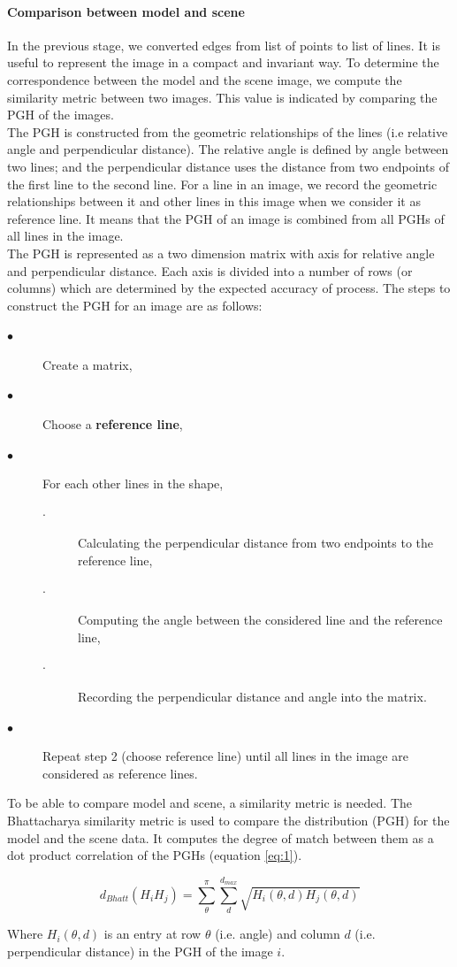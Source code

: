 \documentclass[twoside,twocolumn,10pt]{article}
\begin{document}
\paragraph{Comparison between model and scene}
In the previous stage, we converted edges from list of points to list of lines. It is useful to represent the image in a compact and invariant way. To determine the correspondence between the model and the scene image, we compute the similarity metric between two images. This value is indicated by comparing the PGH\cite{evans1993use} of the images.\\
The PGH is constructed from the geometric relationships of the lines (i.e relative angle and perpendicular distance). The relative angle is defined by angle between two lines; and the perpendicular distance uses the distance from two endpoints of the first line to the second line. For a line in an image, we record the geometric relationships between it and other lines in this image when we consider it as reference line. It means that the PGH of an image is combined from all PGHs of all lines in the image.\\
The PGH is represented as a two dimension matrix with axis for relative angle and perpendicular distance. Each axis is divided into a number of rows (or columns) which are determined by the expected accuracy of process. The steps to construct the PGH for an image are as follows:
{\small{
\begin{description}
\item[$\bullet$] Create a matrix,
\item[$\bullet$] Choose a \textbf{reference line},
\item[$\bullet$] For each other lines in the shape,
	\begin{description}
		\item[$\cdot$] Calculating the perpendicular distance from two endpoints to the reference line,
		\item[$\cdot$] Computing the angle between the considered line and the reference line,
		\item[$\cdot$] Recording the perpendicular distance and angle into the matrix.
	\end{description}
\item[$\bullet$] Repeat step 2 (choose reference line) until all lines in the image are considered as reference lines.
\end{description}
}}
To be able to compare model and scene, a similarity metric
is needed. The Bhattacharya similarity
metric \cite{palaniswamy2010automatic} is used to compare the distribution (PGH) for the model and the
scene data. It computes the degree of match between them as a dot product correlation of the PGHs (equation \ref{eq:1}).
\begin{center}
\begin{equation} \label{eq:1}
d_{Bhatt} (H_{i}H_{j}) = \sum\limits_{\theta}^{\pi}\sum\limits_{d}^{d_{max}}\sqrt{H_{i}(\theta,d)H_{j}(\theta,d)}
\end{equation}
\end{center}
Where $H_{i}(\theta,d)$ is an entry at row $\theta$ (i.e. angle)  and
column $d$ (i.e. perpendicular distance) in the PGH of the image $i$.
 
\end{document}
